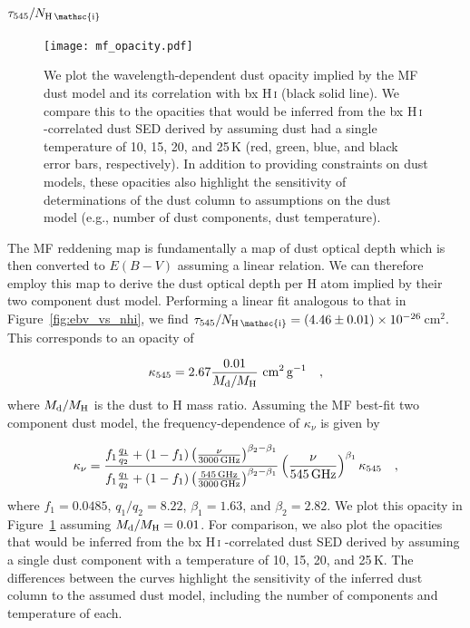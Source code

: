 \documentclass[iop,apj]{emulateapj}
\makeatletter
\def\testbx{bx}%
\DeclareRobustCommand{\ion}[2]{%
\relax\ifmmode
\ifx\testbx\f@series
{\mathbf{#1\,\mathsc{#2}}}\else
{\mathrm{#1\,\mathsc{#2}}}\fi
\else\textup{#1\,{\mdseries\textsc{#2}}}%
\fi}
\makeatother
\begin{document}
\subsection{$\tau_{545}/N_\ion{H}{i}$}
\begin{figure}[tp]
	\texttt{[image: mf\_opacity.pdf]}
	\caption{We plot the wavelength-dependent dust opacity implied by the MF dust model and its correlation with \ion{H}{i} (black solid line). We compare this to the opacities that would be inferred from the \ion{H}{i}-correlated dust SED derived by \citet{Planck_Int_XVII} assuming dust had a single temperature of 10, 15, 20, and 25\,K (red, green, blue, and black error bars, respectively). In addition to providing constraints on dust models, these opacities also highlight the sensitivity of determinations of the dust column to assumptions on the dust model (e.g., number of dust components, dust temperature).}
	\label{fig:mf_opacity}
\end{figure}

The MF reddening map is fundamentally a map of dust optical depth which is then converted to $E(B-V)$ assuming a linear relation. We can therefore employ this map to derive the dust optical depth per H atom implied by their two component dust model. Performing a linear fit analogous to that in Figure~\ref{fig:ebv_vs_nhi}, we find $\tau_{545}/N_\ion{H}{i} = \left(4.46\pm0.01\right)\times10^{-26}$\,cm$^2$. This corresponds to an opacity of

\begin{equation}
\kappa_{545} = 2.67 \frac{0.01}{M_{\rm d}/M_{\rm H}}\ {\rm cm}^2\,{\rm g}^{-1}
~~~,
\end{equation}
where $M_{\rm d}/M_{\rm H}$ is the dust to H mass ratio. Assuming the MF best-fit two component dust model, the frequency-dependence of $\kappa_\nu$ is given by

\begin{equation}
\kappa_\nu = \frac{f_1\frac{q_1}{q_2} + \left(1-f_1\right)\left(\frac{\nu}{\rm 3000\,GHz}\right)^{\beta_2-\beta_1}}{f_1\frac{q_1}{q_2} + \left(1-f_1\right)\left(\frac{\rm 545\,GHz}{\rm 3000\,GHz}\right)^{\beta_2-\beta_1}}\left(\frac{\nu}{\rm 545\,GHz}\right)^{\beta_1}\kappa_{545}
~~~,
\end{equation}
where $f_1 =  0.0485$, $q_1/q_2 = 8.22$, $\beta_1 = 1.63$, and $\beta_2 = 2.82$. We plot this opacity in Figure~\ref{fig:mf_opacity} assuming $M_{\rm d}/M_{\rm H} = 0.01$. For comparison, we also plot the opacities that would be inferred from the \ion{H}{i}-correlated dust SED derived by \citet{Planck_Int_XVII} assuming a single dust component with a temperature of 10, 15, 20, and 25\,K. The differences between the curves highlight the sensitivity of the inferred dust column to the assumed dust model, including the number of components and temperature of each.
\end{document}
